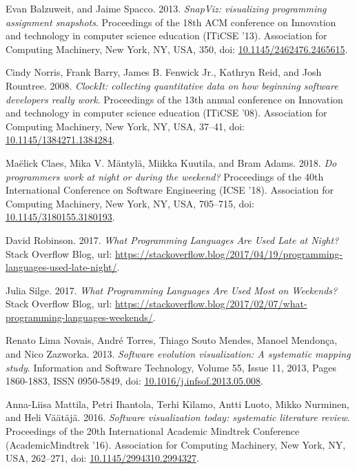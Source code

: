 \begin{thebibliography}{99}
 Evan Balzuweit, and Jaime Spacco. 2013. \textit{SnapViz: visualizing programming assignment snapshots}. Proceedings of the 18th ACM conference on Innovation and technology in computer science education (ITiCSE '13). Association for Computing Machinery, New York, NY, USA, 350, doi: \href{https://doi.org/10.1145/2462476.2465615}{10.1145/2462476.2465615}.

 Cindy Norris, Frank Barry, James B. Fenwick Jr., Kathryn Reid, and Josh Rountree. 2008. \textit{ClockIt: collecting quantitative data on how beginning software developers really work}. Proceedings of the 13th annual conference on Innovation and technology in computer science education (ITiCSE '08). Association for Computing Machinery, New York, NY, USA, 37–41, doi: \href{https://doi.org/10.1145/1384271.1384284}{10.1145/1384271.1384284}.

 Maëlick Claes, Mika V. Mäntylä, Miikka Kuutila, and Bram Adams. 2018. \textit{Do programmers work at night or during the weekend?} Proceedings of the 40th International Conference on Software Engineering (ICSE '18). Association for Computing Machinery, New York, NY, USA, 705–715, doi: \href{https://doi.org/10.1145/3180155.3180193}{10.1145/3180155.3180193}.

 David Robinson. 2017. \textit{What Programming Languages Are Used Late at Night?} Stack Overflow Blog, url: \url{https://stackoverflow.blog/2017/04/19/programming-languages-used-late-night/}.

 Julia Silge. 2017. \textit{What Programming Languages Are Used Most on Weekends?} Stack Overflow Blog, url: \url{https://stackoverflow.blog/2017/02/07/what-programming-languages-weekends/}.

 Renato Lima Novais, André Torres, Thiago Souto Mendes, Manoel Mendonça, and Nico Zazworka. 2013. \textit{Software evolution visualization: A systematic mapping study}. Information and Software Technology, Volume 55, Issue 11, 2013, Pages 1860-1883, ISSN 0950-5849, doi: \href{https://doi.org/10.1016/j.infsof.2013.05.008}{10.1016/j.infsof.2013.05.008}.

 Anna-Liisa Mattila, Petri Ihantola, Terhi Kilamo, Antti Luoto, Mikko Nurminen, and Heli Väätäjä. 2016. \textit{Software visualization today: systematic literature review}. Proceedings of the 20th International Academic Mindtrek Conference (AcademicMindtrek '16). Association for Computing Machinery, New York, NY, USA, 262–271, doi: \href{https://doi.org/10.1145/2994310.2994327}{10.1145/2994310.2994327}.


\end{thebibliography}
